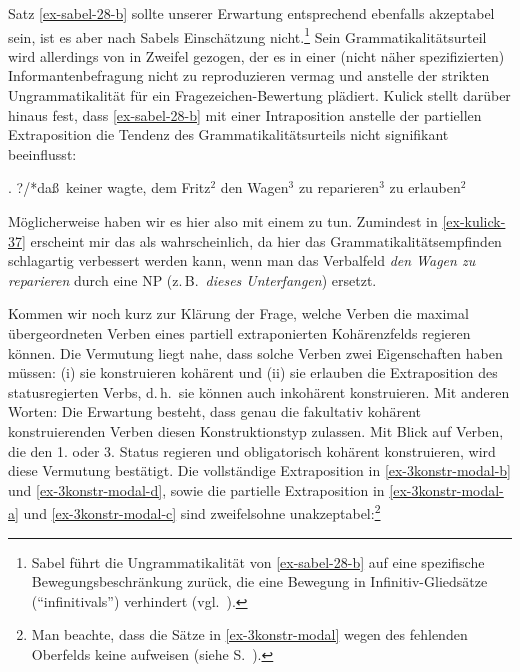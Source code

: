 \largerpage[-1] %
\noindent Satz \ref{ex-sabel-28-b} sollte unserer Erwartung entsprechend ebenfalls akzeptabel sein, ist es aber nach Sabels Einschätzung nicht.\footnote{Sabel führt die Ungrammatikalität von \ref{ex-sabel-28-b} auf eine spezifische Bewegungsbeschränkung zurück, die eine Bewegung in Infinitiv-Gliedsätze ("`infinitivals"') verhindert (vgl.\ \citealt[418]{Sabel:95}). } Sein Grammatikalitätsurteil wird allerdings von \cite{Kulick:00} in Zweifel gezogen, der es in einer (nicht näher spezifizierten) Informantenbefragung nicht zu reproduzieren vermag und anstelle der strikten Ungrammatikalität für ein Fragezeichen-Bewertung plädiert. Kulick stellt darüber hinaus fest, dass \ref{ex-sabel-28-b} mit einer Intraposition anstelle der partiellen Extraposition die Tendenz des Grammatikalitätsurteils nicht signifikant beeinflusst:

\ex. ?/*\label{ex-kulick-37}da\ss\ keiner wagte, dem Fritz$^2$ den Wagen$^3$ zu reparieren$^3$ zu erlauben$^2$ \\ \citep[(37)]{Kulick:00} 

Möglicherweise haben wir es hier also mit einem  zu tun. Zumindest in \ref{ex-kulick-37} erscheint mir das als wahrscheinlich, da hier das Grammatikalitätsempfinden schlagartig verbessert werden kann, wenn man das Verbalfeld {\it den Wagen zu reparieren} durch  eine NP (z.\,B.\ {\it dieses Unterfangen}) ersetzt. 


Kommen wir noch kurz zur Klärung der Frage, welche Verben die maximal übergeordneten Verben eines partiell extraponierten Kohärenzfelds regieren können. Die Vermutung liegt nahe, dass solche Verben zwei Eigenschaften haben müssen: (i) sie konstruieren kohärent und (ii) sie erlauben die Extraposition des statusregierten Verbs, d.\,h.\ sie können auch inkohärent konstruieren. Mit anderen Worten: Die Erwartung besteht, dass genau die fakultativ kohärent konstruierenden Verben diesen Konstruktionstyp zulassen. Mit Blick auf Verben, die den 1. oder 3. Status regieren und obligatorisch kohärent konstruieren, wird diese Vermutung bestätigt. Die vollständige Extraposition in \ref{ex-3konstr-modal-b} und \ref{ex-3konstr-modal-d}, sowie die partielle Extraposition in \ref{ex-3konstr-modal-a} und \ref{ex-3konstr-modal-c} sind zweifelsohne unakzeptabel:\footnote{Man beachte, dass die Sätze in \ref{ex-3konstr-modal} wegen des fehlenden Oberfelds keine  aufweisen (siehe S.~\pageref{sec-linksstellung}). } 

